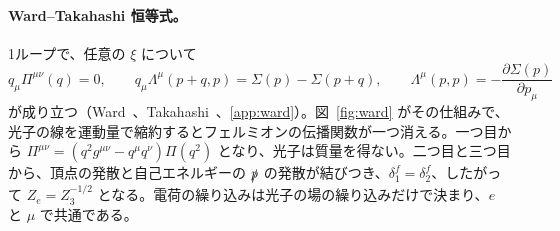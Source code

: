 \documentclass[a4paper,10pt]{ltjsarticle}
\begin{document}
\paragraph{Ward--Takahashi 恒等式。}1ループで、任意の $\xi$ について
\begin{equation}
q_\mu\Pi^{\mu\nu}(q)=0,\qquad
q_\mu\Lambda^\mu(p+q,p)=\Sigma(p)-\Sigma(p+q),\qquad
\Lambda^\mu(p,p)=-\frac{\partial\Sigma(p)}{\partial p_\mu}
\label{eq:ward}
\end{equation}
が成り立つ（Ward~\cite{ward}、Takahashi~\cite{takahashi}、\ref{app:ward}）。図~\ref{fig:ward} がその仕組みで、光子の線を運動量で縮約するとフェルミオンの伝播関数が一つ消える。一つ目から $\Pi^{\mu\nu}=(q^2g^{\mu\nu}-q^\mu q^\nu)\Pi(q^2)$ となり、光子は質量を得ない。二つ目と三つ目から、頂点の発散と自己エネルギーの $\slashed p$ の発散が結びつき、$\delta_1^f=\delta_2^f$、したがって $Z_e=Z_3^{-1/2}$ となる。電荷の繰り込みは光子の場の繰り込みだけで決まり、$e$ と $\mu$ で共通である。
\end{document}
